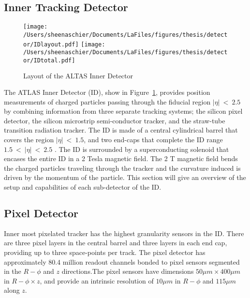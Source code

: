 \subsection{Inner Tracking Detector}
  \begin{figure}[tbp]
 \texttt{[image: /Users/sheenaschier/Documents/LaFiles/figures/thesis/detector/IDlayout.pdf]}
  \texttt{[image: /Users/sheenaschier/Documents/LaFiles/figures/thesis/detector/IDtotal.pdf]}
    \caption{Layout of the ALTAS Inner Detector}
   \label{fig:ID}
 \end{figure}
The ATLAS Inner Detector (ID), show in Figure~\ref{fig:ID}, provides position measurements of charged particles passing through the fiducial region $|\eta|~<~2.5$ by combining information from three separate tracking systems; the silicon pixel detector, the silicon microstrip semi-conductor tracker, and the straw-tube transition radiation tracker.  The ID is made of a central cylindrical barrel that covers the region $|\eta|~<~1.5$, and two end-caps that complete the ID range $1.5~<~|\eta|~<~2.5$ . The ID is surrounded by a superconducting solenoid that encases the entire ID in a 2 Tesla magnetic field.  The 2 T magnetic field bends the charged particles traveling through the tracker and the curvature induced is driven by the momentum of the particle. This section will give an overview of the setup and capabilities of each sub-detector of the ID.  
\iffalse
  \begin{figure}[tbp]
 \texttt{[image: /Users/sheenaschier/Documents/LaFiles/figures/thesis/detector/ID.pdf]}
  \texttt{[image: /Users/sheenaschier/Documents/LaFiles/figures/thesis/detector/IDendcap.pdf]}
    \caption{Layout of the ALTAS Inner Detector}
   \label{fig:IDscematic}
 \end{figure}
\fi
\subsection{Pixel Detector}
Inner most pixelated tracker has the highest granularity sensors in the ID.  There are three pixel layers in the central barrel and three layers in each end cap, providing up to three space-points per track.  The pixel detector has approximately 80.4 million readout channels bonded to pixel sensors segmented in the $R-\phi$ and $z$ directions.The pixel sensors have dimensions $50\mu m \times 400\mu m$ in $R-\phi \times z$, and provide an intrinsic resolution of $10\mu m$ in $R-\phi$ and $115 \mu m$ along $z$.  

